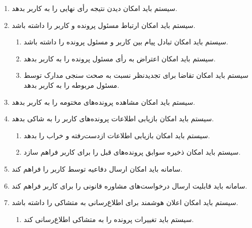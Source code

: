\documentclass[12pt,a4paper,oneside]{article}
\begin{document}
\begin{itemize}
\begin{enumerate}
        \item 
        سیستم باید امکان دیدن نتیجه رأی نهایی را به کاربر بدهد.

        \item 
        سیستم باید امکان ارتباط مسئول پرونده و کاربر را داشته باشد.
        \begin{enumerate}
            \renewcommand{\labelenumii}{\textbf{.R\arabic{enumi}.\arabic{enumii}}}
            \item 
            سیستم باید امکان تبادل پیام بین کاربر و مسئول پرونده را داشته باشد.
            \item 
            سیستم باید امکان اعتراض به رأی مسئول پرونده را به کاربر بدهد.
            \item 
            سیستم باید امکان تقاضا برای تجدیدنظر نسبت به صحت سنجی مدارک توسط مسئول مربوطه را به کاربر بدهد.
        \end{enumerate}

        \item 
        سیستم باید امکان مشاهده پرونده‌های مختومه را به کاربر بدهد.

        \item 
        سیستم باید امکان بازیابی اطلاعات پرونده‌های کاربر را به شاکی بدهد.
        \begin{enumerate}
            \renewcommand{\labelenumii}{\textbf{.R\arabic{enumi}.\arabic{enumii}}}
            \item 
            سیستم باید امکان بازیابی اطلاعات ازدست‌رفته و خراب را بدهد.
            \item 
            سیستم باید امکان ذخیره سوابق پرونده‌های قبل را برای کاربر فراهم سازد.
        \end{enumerate}	

        \item 
        سامانه باید امکان ارسال دفاعیه توسط کاربر را فراهم کند.

        \item 
        سامانه باید قابلیت ارسال درخواست‌های مشاوره قانونی را برای کاربر فراهم کند.


		\item 
        سیستم باید امکان اعلان هوشمند برای اطلاع‌رسانی به متشاکی را داشته باشد.
        \begin{enumerate}
            \renewcommand{\labelenumii}{\textbf{.R\arabic{enumi}.\arabic{enumii}}}
            \item 
            سیستم باید تغییرات پرونده را به متشاکی اطلاع‌رسانی کند.
        \end{enumerate}



\end{enumerate}
\end{itemize}
\end{document}
